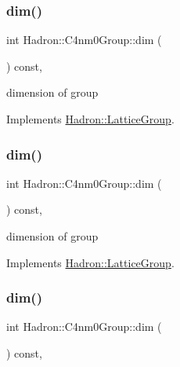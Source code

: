 \subsubsection{\texorpdfstring{dim()}{dim()}\hspace{0.1cm}{\footnotesize\ttfamily [1/3]}}
{\footnotesize\ttfamily int Hadron\+::\+C4nm0\+Group\+::dim (\begin{DoxyParamCaption}{ }\end{DoxyParamCaption}) const\hspace{0.3cm}{\ttfamily [inline]}, {\ttfamily [virtual]}}

dimension of group 

Implements \mbox{\hyperlink{structHadron_1_1LatticeGroup_abd8415698323796ef6a8605796ee3bea}{Hadron\+::\+Lattice\+Group}}.

\mbox{\label{structHadron_1_1C4nm0Group_adc1a59b08c4fafae324e82e8ded86919}} 
\subsubsection{\texorpdfstring{dim()}{dim()}\hspace{0.1cm}{\footnotesize\ttfamily [2/3]}}
{\footnotesize\ttfamily int Hadron\+::\+C4nm0\+Group\+::dim (\begin{DoxyParamCaption}{ }\end{DoxyParamCaption}) const\hspace{0.3cm}{\ttfamily [inline]}, {\ttfamily [virtual]}}

dimension of group 

Implements \mbox{\hyperlink{structHadron_1_1LatticeGroup_abd8415698323796ef6a8605796ee3bea}{Hadron\+::\+Lattice\+Group}}.

\mbox{\label{structHadron_1_1C4nm0Group_adc1a59b08c4fafae324e82e8ded86919}} 
\subsubsection{\texorpdfstring{dim()}{dim()}\hspace{0.1cm}{\footnotesize\ttfamily [3/3]}}
{\footnotesize\ttfamily int Hadron\+::\+C4nm0\+Group\+::dim (\begin{DoxyParamCaption}{ }\end{DoxyParamCaption}) const\hspace{0.3cm}{\ttfamily [inline]}, {\ttfamily [virtual]}}

